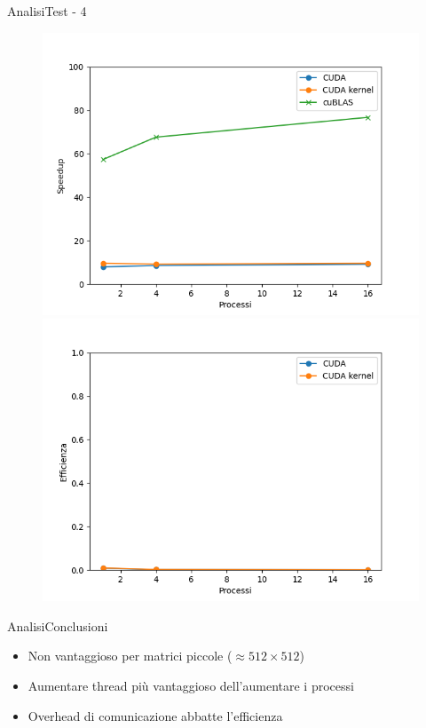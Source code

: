 \begin{frame}{Analisi}{Test - 4}
    \begin{figure}[H]
        \centering
        \begin{minipage}{0.48\textwidth}
            \includegraphics[width=\textwidth]{./imgs/graphs/caso_d_speedup.png}
        \end{minipage}
        \begin{minipage}{0.48\textwidth}
            \includegraphics[width=\textwidth]{./imgs/graphs/caso_d_efficiency.png}
        \end{minipage}
    \end{figure}
\end{frame}

\begin{frame}{Analisi}{Conclusioni}
    \begin{itemize}
        \item Non vantaggioso per matrici piccole ($\approx 512 \times 512$)
        \item Aumentare thread più vantaggioso dell'aumentare i processi
        \item Overhead di comunicazione abbatte l'efficienza
    \end{itemize}
\end{frame}